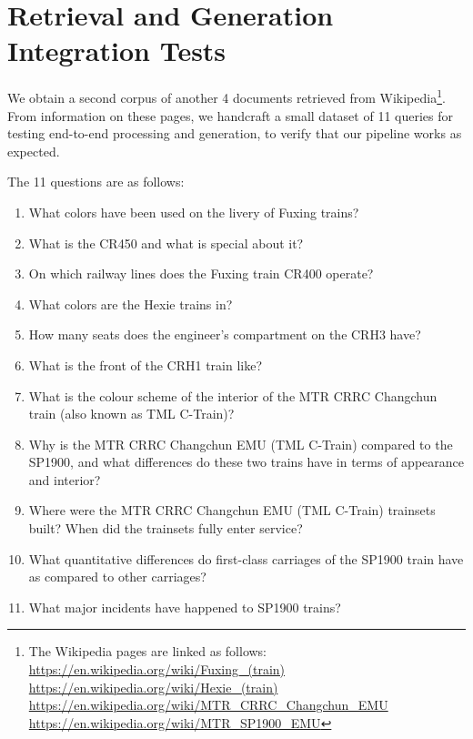 \section{Retrieval and Generation Integration Tests}
\label{appendix:integrationtests}

We obtain a second corpus of another 4 documents retrieved from Wikipedia\footnote{The Wikipedia pages are linked as follows: \\
\url{https://en.wikipedia.org/wiki/Fuxing_(train)} \\
\url{https://en.wikipedia.org/wiki/Hexie_(train)} \\
\url{https://en.wikipedia.org/wiki/MTR_CRRC_Changchun_EMU} \\
\url{https://en.wikipedia.org/wiki/MTR_SP1900_EMU}
}.
From information on these pages, we handcraft a small dataset of 11 queries for testing end-to-end processing and generation,
to verify that our pipeline works as expected.

The 11 questions are as follows:
\begin{enumerate}
    \item What colors have been used on the livery of Fuxing trains?
    \item What is the CR450 and what is special about it?
    \item On which railway lines does the Fuxing train CR400 operate?
    \item What colors are the Hexie trains in?
    \item How many seats does the engineer's compartment on the CRH3 have?
    \item What is the front of the CRH1 train like?
    \item What is the colour scheme of the interior of the MTR CRRC Changchun train (also known as TML C-Train)?
    \item Why is the MTR CRRC Changchun EMU (TML C-Train) compared to the SP1900, and what differences do these two trains have in terms of appearance and interior?
    \item Where were the MTR CRRC Changchun EMU (TML C-Train) trainsets built? When did the trainsets fully enter service?
    \item What quantitative differences do first-class carriages of the SP1900 train have as compared to other carriages?
    \item What major incidents have happened to SP1900 trains?
\end{enumerate}

